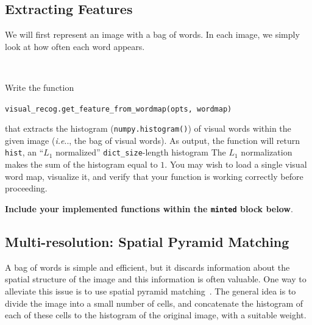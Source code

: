 \documentclass[11pt]{article}
\makeatletter
\numberwithin{equation}{section} %
\numberwithin{figure}{section} %
\numberwithin{table}{section} %
\DeclareRobustCommand\onedot{\futurelet\@let@token\@onedot}
\def\@onedot{\ifx\@let@token.\else.\null\fi\xspace}
\def\ie{\emph{i.e}\onedot} \def\Ie{\emph{I.e}\onedot}
\makeatother
\begin{document}
\subsection{Extracting Features}

We will first represent an image with a bag of words. In each image, we simply look at how often each word appears.
\par ~
\par {}
Write the function
\begin{center}
{\tt visual\_recog.get\_feature\_from\_wordmap(opts, wordmap)}
\end{center}
that extracts the histogram ({\tt numpy.histogram()}) of visual words within the given image
(\ie, the bag of visual words).
As output, the function will return {\tt hist}, an
``$L_1$ normalized'' {\tt dict\_size}-length histogram The $L_1$ normalization makes the sum of the histogram equal to $1$. 
You may wish to load a single visual word map, visualize it, and verify that your function is working correctly before proceeding.

\textbf{Include your implemented functions  within the \texttt{minted} block below}.



\subsection{Multi-resolution: Spatial Pyramid Matching}
A bag of words is simple and efficient, but it discards information about the spatial structure of the image and this information is often valuable. 
One way to alleviate this issue is to use spatial pyramid matching~\cite{1641019}. The general idea is to divide the image into a small number of cells, and concatenate the histogram of each of these cells to the histogram of the original image, with a suitable weight. 
\end{document}
